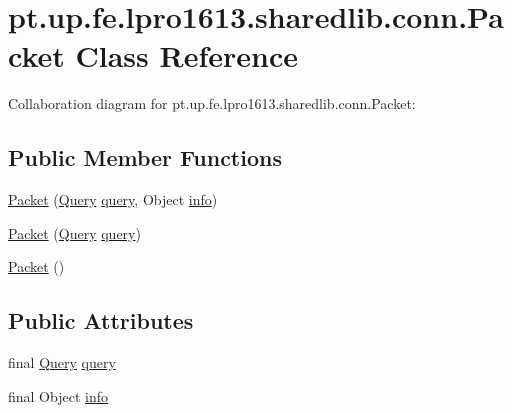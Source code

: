\hypertarget{classpt_1_1up_1_1fe_1_1lpro1613_1_1sharedlib_1_1conn_1_1_packet}{}\section{pt.\+up.\+fe.\+lpro1613.\+sharedlib.\+conn.\+Packet Class Reference}
\label{classpt_1_1up_1_1fe_1_1lpro1613_1_1sharedlib_1_1conn_1_1_packet}


Collaboration diagram for pt.\+up.\+fe.\+lpro1613.\+sharedlib.\+conn.\+Packet\+:
\subsection*{Public Member Functions}
\begin{DoxyCompactItemize}
\item 
\hyperlink{classpt_1_1up_1_1fe_1_1lpro1613_1_1sharedlib_1_1conn_1_1_packet_aeae6b0942efe9aff4aa95a95bdbd89a0}{Packet} (\hyperlink{enumpt_1_1up_1_1fe_1_1lpro1613_1_1sharedlib_1_1conn_1_1_query}{Query} \hyperlink{classpt_1_1up_1_1fe_1_1lpro1613_1_1sharedlib_1_1conn_1_1_packet_acdc36b134a4d54ae9d3358264584864b}{query}, Object \hyperlink{classpt_1_1up_1_1fe_1_1lpro1613_1_1sharedlib_1_1conn_1_1_packet_aa45162e897c5b5a34e4d6c4632cbc096}{info})
\item 
\hyperlink{classpt_1_1up_1_1fe_1_1lpro1613_1_1sharedlib_1_1conn_1_1_packet_a84cf92efe772ec2576fe319cee43effc}{Packet} (\hyperlink{enumpt_1_1up_1_1fe_1_1lpro1613_1_1sharedlib_1_1conn_1_1_query}{Query} \hyperlink{classpt_1_1up_1_1fe_1_1lpro1613_1_1sharedlib_1_1conn_1_1_packet_acdc36b134a4d54ae9d3358264584864b}{query})
\item 
\hyperlink{classpt_1_1up_1_1fe_1_1lpro1613_1_1sharedlib_1_1conn_1_1_packet_af3d893f2e45e4ac0e216a2893e36b2b4}{Packet} ()
\end{DoxyCompactItemize}
\subsection*{Public Attributes}
\begin{DoxyCompactItemize}
\item 
final \hyperlink{enumpt_1_1up_1_1fe_1_1lpro1613_1_1sharedlib_1_1conn_1_1_query}{Query} \hyperlink{classpt_1_1up_1_1fe_1_1lpro1613_1_1sharedlib_1_1conn_1_1_packet_acdc36b134a4d54ae9d3358264584864b}{query}
\item 
final Object \hyperlink{classpt_1_1up_1_1fe_1_1lpro1613_1_1sharedlib_1_1conn_1_1_packet_aa45162e897c5b5a34e4d6c4632cbc096}{info}
\end{DoxyCompactItemize}


